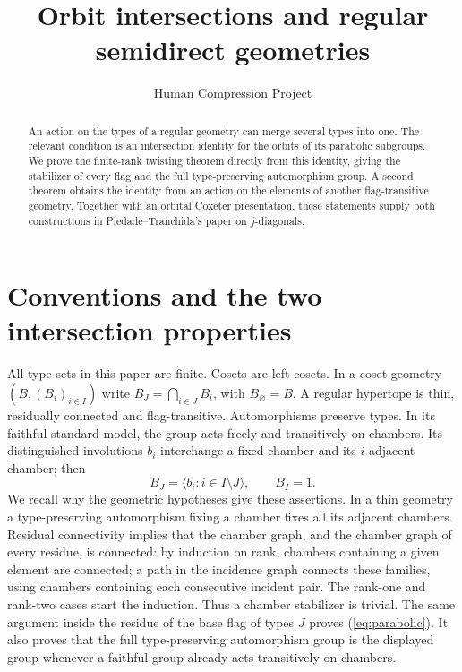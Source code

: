 
\title{Orbit intersections and regular semidirect geometries}
\author{Human Compression Project}\date{}
\maketitle
\begin{abstract}
An action on the types of a regular geometry can merge several types into one. The relevant condition is an intersection identity for the orbits of its parabolic subgroups. We prove the finite-rank twisting theorem directly from this identity, giving the stabilizer of every flag and the full type-preserving automorphism group. A second theorem obtains the identity from an action on the elements of another flag-transitive geometry. Together with an orbital Coxeter presentation, these statements supply both constructions in Piedade--Tranchida's paper on $j$-diagonals.
\end{abstract}
\section{Conventions and the two intersection properties}
All type sets in this paper are finite. Cosets are left cosets. In a coset geometry $(B,(B_i)_{i\in I})$ write $B_J=\bigcap_{i\in J}B_i$, with $B_\varnothing=B$. A regular hypertope is thin, residually connected and flag-transitive. Automorphisms preserve types. In its faithful standard model, the group acts freely and transitively on chambers. Its distinguished involutions $b_i$ interchange a fixed chamber and its $i$-adjacent chamber; then
\begin{equation}\label{eq:parabolic}
B_J=\langle b_i:i\in I\setminus J\rangle,\qquad B_I=1.
\end{equation}
We recall why the geometric hypotheses give these assertions. In a thin geometry a type-preserving automorphism fixing a chamber fixes all its adjacent chambers. Residual connectivity implies that the chamber graph, and the chamber graph of every residue, is connected: by induction on rank, chambers containing a given element are connected; a path in the incidence graph connects these families, using chambers containing each consecutive incident pair. The rank-one and rank-two cases start the induction. Thus a chamber stabilizer is trivial. The same argument inside the residue of the base flag of types $J$ proves (\ref{eq:parabolic}). It also proves that the full type-preserving automorphism group is the displayed group whenever a faithful group already acts transitively on chambers.

